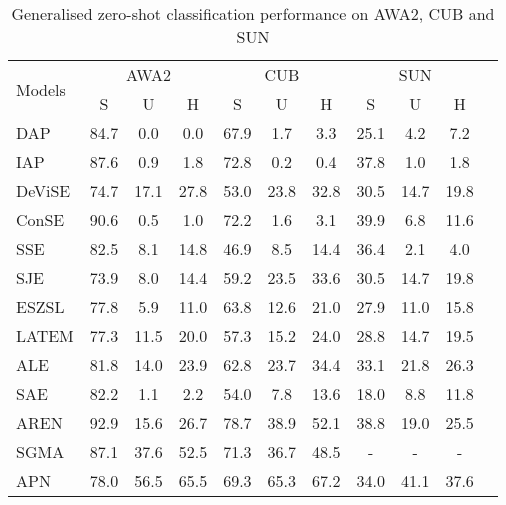 \documentclass[a4paper,11pt]{article}
\begin{document}
\begin{table} [!h]%
\begin{threeparttable}
\centering
\caption{Generalised zero-shot classification performance on AWA2, CUB and SUN}
\label{tab:Perfromance}
\begin{tabular}{|l|c|c|c|c|c|c|c|c|c|c|} 
\hline
\multirow{2}{*}{Models} & \multicolumn{3}{c|}{AWA2} & \multicolumn{3}{c|}{CUB} & \multicolumn{3}{c|}{SUN}   \\ 
\cline{2-10}
& S & U & H & S & U & H & S & U & H \\
\hline
DAP \cite{5206594}   & 84.7 & 0.0 & 0.0 & 67.9 & 1.7 & 3.3 & 25.1 & 4.2 & 7.2 \\
IAP \cite{5206594}   & 87.6 & 0.9 & 1.8 & 72.8 & 0.2 & 0.4 & 37.8 & 1.0 & 1.8 \\
DeViSE \cite{DeViSE} & 74.7 & 17.1 & 27.8 & 53.0 & 23.8 & 32.8 & 30.5 & 14.7 & 19.8 \\
ConSE \cite{ConSE}   & {\color{blue}90.6} & 0.5 & 1.0 & 72.2 & 1.6 & 3.1 & 39.9 & 6.8 & 11.6 \\
SSE \cite{SSE}       & 82.5 & 8.1 & 14.8 & 46.9 & 8.5 & 14.4 & 36.4 & 2.1 & 4.0 \\
SJE \cite{SJE}       & 73.9 & 8.0 & 14.4 & 59.2 & 23.5 & 33.6 & 30.5 & 14.7 & 19.8 \\
ESZSL \cite{romera-paredes15}   & 77.8 & 5.9 & 11.0 & 63.8 & 12.6 & 21.0 & 27.9 & 11.0 & 15.8 \\
LATEM \cite{LATEM}   & 77.3 & 11.5 & 20.0 & 57.3 & 15.2 & 24.0 & 28.8 & 14.7 & 19.5 \\
ALE \cite{ALE}       & 81.8 & 14.0 & 23.9 & 62.8 & 23.7 & 34.4 & 33.1 & 21.8 & 26.3 \\
SAE \cite{SAE}       & 82.2 & 1.1 & 2.2 & 54.0 & 7.8 & 13.6 & 18.0 & 8.8 & 11.8 \\
AREN \cite{AREN}     & {\color{red}92.9} & 15.6 & 26.7  & {\color{red}78.7} & 38.9 & 52.1 & {\color{blue}38.8} & 19.0 & 25.5 \\




SGMA \cite{SGMA}     & 87.1 & 37.6 & 52.5  & {71.3} & 36.7 & 48.5 & - & - & - \\
APN \cite{APN}       & 78.0 & {\color{blue}56.5} & {\color{blue}65.5}  & 69.3 & {\color{blue}65.3} & {\color{blue}67.2} & 34.0 & {\color{blue}41.1} & 37.6 \\


\end{tabular}
\end{threeparttable}
\end{table}
\end{document}
